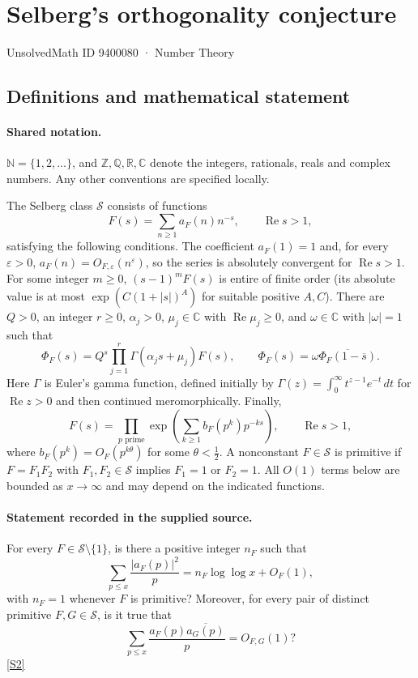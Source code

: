 \documentclass[11pt]{article}
\newcommand{\sref}[2]{\hyperlink{source:#1:#2}{[S#2]}}
\begin{document}
\setcounter{section}{9400079}
\section{Selberg's orthogonality conjecture}\label{9400080}
{\small\sffamily UnsolvedMath ID 9400080 · Number Theory}
\subsection{Definitions and mathematical statement}

\paragraph{Shared notation.}$\mathbb N=\{1,2,\ldots\}$, and $\mathbb Z,\mathbb Q,\mathbb R,\mathbb C$ denote the integers, rationals, reals and complex numbers. Any other conventions are specified locally.


The Selberg class $\mathcal S$ consists of functions
\[F(s)=\sum_{n\ge1}a_F(n)n^{-s},\qquad \operatorname{Re}s>1,\]
satisfying the following conditions. The coefficient $a_F(1)=1$ and, for every $\varepsilon>0$, $a_F(n)=O_{F,\varepsilon}(n^\varepsilon)$, so the series is absolutely convergent for $\operatorname{Re}s>1$. For some integer $m\ge0$, $(s-1)^mF(s)$ is entire of finite order (its absolute value is at most $\exp(C(1+|s|)^A)$ for suitable positive $A,C$). There are $Q>0$, an integer $r\ge0$, $\alpha_j>0$, $\mu_j\in\mathbb C$ with $\operatorname{Re}\mu_j\ge0$, and $\omega\in\mathbb C$ with $|\omega|=1$ such that
\[\Phi_F(s)=Q^s\prod_{j=1}^r\Gamma(\alpha_j s+\mu_j)F(s),\qquad \Phi_F(s)=\omega\overline{\Phi_F(1-\overline s)}.\]
Here $\Gamma$ is Euler's gamma function, defined initially by $\Gamma(z)=\int_0^\infty t^{z-1}e^{-t}\,dt$ for $\operatorname{Re}z>0$ and then continued meromorphically. Finally,
\[F(s)=\prod_{p\text{ prime}}\exp\left(\sum_{k\ge1}b_F(p^k)p^{-ks}\right),\qquad \operatorname{Re}s>1,\]
where $b_F(p^k)=O_F(p^{k\theta})$ for some $\theta<\tfrac12$. A nonconstant $F\in\mathcal S$ is primitive if $F=F_1F_2$ with $F_1,F_2\in\mathcal S$ implies $F_1=1$ or $F_2=1$. All $O(1)$ terms below are bounded as $x\to\infty$ and may depend on the indicated functions.
\paragraph{Statement recorded in the supplied source.}
For every $F\in\mathcal S\setminus\{1\}$, is there a positive integer $n_F$ such that
\[\sum_{p\le x}\frac{|a_F(p)|^2}{p}=n_F\log\log x+O_F(1),\]
with $n_F=1$ whenever $F$ is primitive? Moreover, for every pair of distinct primitive $F,G\in\mathcal S$, is it true that
\[\sum_{p\le x}\frac{a_F(p)\overline{a_G(p)}}p=O_{F,G}(1)?\] \sref{9400080}{2}
\end{document}
